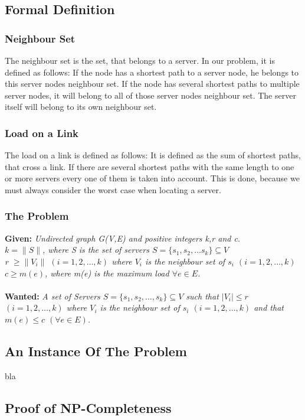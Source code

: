 \documentclass [12pt]{article}
\begin{document}
\subsection{Formal Definition}
\subsubsection{Neighbour Set}
    The neighbour set is the set, that belongs to a server. In our problem, it is
    defined as follows: If the node has a shortest path to a server node, he 
    belongs to this server nodes neighbour set. If the node has several shortest
    paths to multiple server nodes, it will belong to all of those server nodes neighbour
    set. The server itself will belong to its own neighbour set.
\subsubsection{Load on a Link}
    The load on a link is defined as follows: 
    It is defined as the sum of shortest paths, that cross a link. If there
    are several shortest paths with the same length to one or more servers every
    one of them is taken into account. This is done, because we must always consider
    the worst case when locating a server.
    \subsubsection{The Problem}
\textbf{Given:}
{\itshape Undirected graph G(V,E) and  positive integers k,r and c. \\
$k = \|S\|$, where S is the set of servers $S = \{s_1,s_2,\dots s_k\} \subseteq V$\\
r $\geq  \|V_i\|$ $(i=1,2,\dots,k)$ where $V_i$ is the neighbour set of $s_i$ $(i=1,2,\dots,k)$\\
$c \geq m(e)$, where m(e) is the maximum load $\forall e \in E$.} \\
\\
\textbf{Wanted:} 
{\itshape A set of Servers $S = \{s_1, s_2,\dots, s_k \} \subseteq V$ such that $|V_i|\leq r$
    $(i = 1,2, \dots,k)$ where $V_i$ is the neighbour set of $s_i$  $(i = 1,2,\dots,k)$ and that
$m(e) \leq c$ $(\forall e \in E)$.}

\subsection{An Instance Of The Problem}
bla
\subsection{Proof of NP-Completeness}
\end{document}
